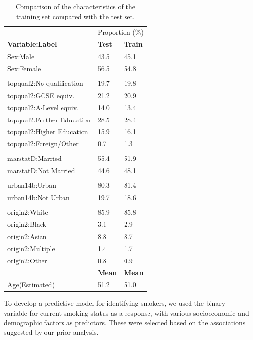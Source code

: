 \documentclass[
  11pt,
  twocolumn]{article}
\begin{document}
\begin{table}
\centering
\caption{\label{tab:outputtesttraintable}Comparison of the characteristics of the training set compared with the test set.\label{tab:output-testtrain-table}}
\centering
\fontsize{10}{12}\selectfont
\begin{tabular}[t]{l|l|l}
\hline
\multicolumn{1}{c|}{ } & \multicolumn{2}{c}{Proportion (\%)} \\
\cline{2-3}
\textbf{Variable:Label} & \textbf{Test} & \textbf{Train}\\
\hline
Sex:Male & 43.5 & 45.1\\
\hline
Sex:Female & 56.5 & 54.8\\
\hline
 &  \vphantom{3} & \\
\hline
topqual2:No qualification & 19.7 & 19.8\\
\hline
topqual2:GCSE equiv. & 21.2 & 20.9\\
\hline
topqual2:A-Level equiv. & 14.0 & 13.4\\
\hline
topqual2:Further Education & 28.5 & 28.4\\
\hline
topqual2:Higher Education & 15.9 & 16.1\\
\hline
topqual2:Foreign/Other & 0.7 & 1.3\\
\hline
 &  \vphantom{2} & \\
\hline
marstatD:Married & 55.4 & 51.9\\
\hline
marstatD:Not Married & 44.6 & 48.1\\
\hline
 &  \vphantom{1} & \\
\hline
urban14b:Urban & 80.3 & 81.4\\
\hline
urban14b:Not Urban & 19.7 & 18.6\\
\hline
 &  & \\
\hline
origin2:White & 85.9 & 85.8\\
\hline
origin2:Black & 3.1 & 2.9\\
\hline
origin2:Asian & 8.8 & 8.7\\
\hline
origin2:Multiple & 1.4 & 1.7\\
\hline
origin2:Other & 0.8 & 0.9\\
\hline
\textbf{} & \textbf{Mean} & \textbf{Mean}\\
\hline
Age(Estimated) & 51.2 & 51.0\\
\hline
\end{tabular}
\end{table}

To develop a predictive model for identifying smokers, we used the
binary variable for current smoking status as a response, with various
socioeconomic and demographic factors as predictors. These were selected
based on the associations suggested by our prior analysis.
\end{document}

